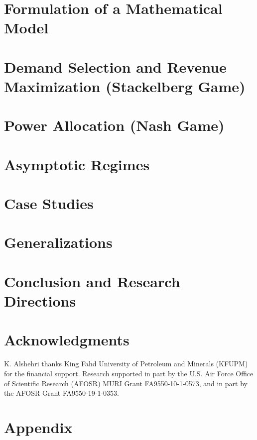 \documentclass[10 pt, journal]{IEEEtran}
\begin{document}
\section{Formulation of a Mathematical Model}
 \label{formulation}

\section{Demand Selection and Revenue Maximization (Stackelberg Game)} \label{game1}

\section{Power Allocation (Nash Game)} \label{game2}


\section{Asymptotic Regimes} \label{asymp}

\section{Case Studies} \label{numerical}


\section{Generalizations} \label{generalizations}



\section{Conclusion and Research Directions} \label{conclusion}


\section{Acknowledgments}
K. Alshehri thanks King Fahd University of Petroleum and Minerals (KFUPM) for the financial support. Research supported in part by the U.S. Air Force Office of Scientific Research (AFOSR) MURI Grant FA9550-10-1-0573, and in part by the AFOSR Grant FA9550-19-1-0353.

\section{Appendix}




\end{document}
